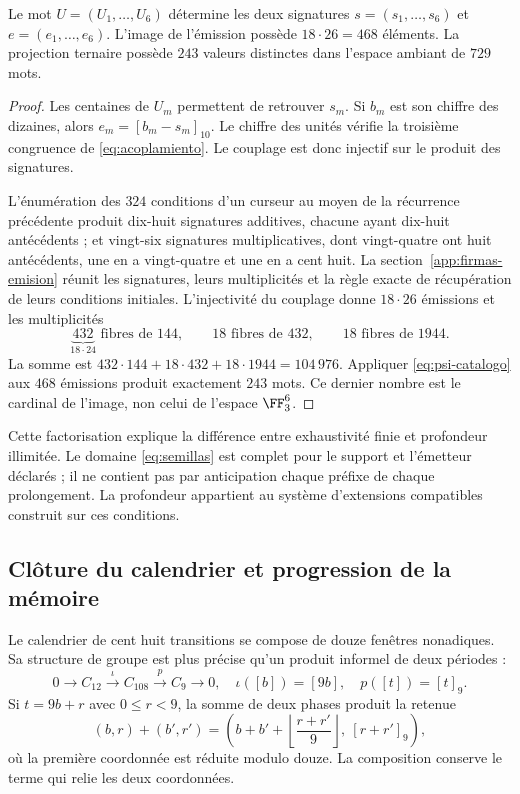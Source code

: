 \begin{proposition}
Le mot \(U=(U_1,\ldots,U_6)\) détermine les deux signatures \(s=(s_1,\ldots,s_6)\) et \(e=(e_1,\ldots,e_6)\). L’image de l’émission possède \(18\cdot26=468\) éléments. La projection ternaire possède \(243\) valeurs distinctes dans l’espace ambiant de \(729\) mots.
\end{proposition}
\begin{proof}
Les centaines de \(U_m\) permettent de retrouver \(s_m\). Si \(b_m\) est son chiffre des dizaines, alors \(e_m=[b_m-s_m]_{10}\). Le chiffre des unités vérifie la troisième congruence de \eqref{eq:acoplamiento}. Le couplage est donc injectif sur le produit des signatures.

L'énumération des \(324\) conditions d'un curseur au moyen de la récurrence précédente produit dix-huit signatures additives, chacune ayant dix-huit antécédents ; et vingt-six signatures multiplicatives, dont vingt-quatre ont huit antécédents, une en a vingt-quatre et une en a cent huit. La section~\ref{app:firmas-emision} réunit les signatures, leurs multiplicités et la règle exacte de récupération de leurs conditions initiales. L'injectivité du couplage donne \(18\cdot26\) émissions et les multiplicités
\[
 \underbrace{432}_{18\cdot24}\text{ fibres de }144,
 \qquad18\text{ fibres de }432,
 \qquad18\text{ fibres de }1944.
\]
La somme est \(432\cdot144+18\cdot432+18\cdot1944=104\,976\). Appliquer \eqref{eq:psi-catalogo} aux \(468\) émissions produit exactement \(243\) mots. Ce dernier nombre est le cardinal de l’image, non celui de l’espace \(\FF_3^6\).
\end{proof}

Cette factorisation explique la différence entre exhaustivité finie et profondeur illimitée. Le domaine \eqref{eq:semillas} est complet pour le support et l’émetteur déclarés ; il ne contient pas par anticipation chaque préfixe de chaque prolongement. La profondeur appartient au système d’extensions compatibles construit sur ces conditions.

\subsection{Clôture du calendrier et progression de la mémoire}

Le calendrier de cent huit transitions se compose de douze fenêtres nonadiques. Sa structure de groupe est plus précise qu’un produit informel de deux périodes :
\begin{equation}
 0\longrightarrow C_{12}\xrightarrow{\iota}C_{108}
 \xrightarrow{p}C_9\longrightarrow0,
 \quad\iota([b])=[9b],\quad p([t])=[t]_9.
 \label{eq:extension108}
\end{equation}
Si \(t=9b+r\) avec \(0\le r<9\), la somme de deux phases produit la retenue
\[
 (b,r)+(b',r')=
 \left(b+b'+\left\lfloor\frac{r+r'}9\right\rfloor,\ [r+r']_9\right),
\]
où la première coordonnée est réduite modulo douze. La composition conserve le terme qui relie les deux coordonnées.

